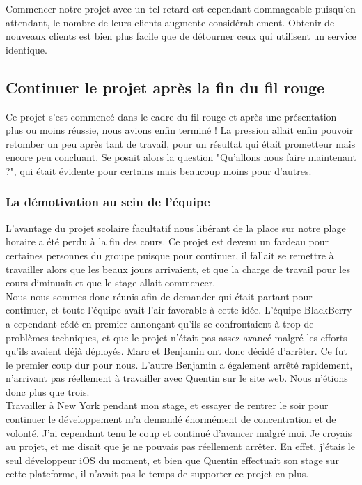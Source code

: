 \documentclass{article}
\begin{document}
		Commencer notre projet avec un tel retard est cependant dommageable puisqu'en attendant, le nombre de leurs clients augmente considérablement. Obtenir de nouveaux clients est bien plus facile que de détourner ceux qui utilisent un service identique.
		
	\subsection{Continuer le projet après la fin du fil rouge}
	Ce projet s'est commencé dans le cadre du fil rouge et après une présentation plus ou moins réussie, nous avions enfin terminé ! La pression allait enfin pouvoir retomber un peu après tant de travail, pour un résultat qui était prometteur mais encore peu concluant. Se posait alors la question "Qu'allons nous faire maintenant ?", qui était évidente pour certains mais beaucoup moins pour d'autres.


		\subsubsection{La démotivation au sein de l'équipe}
		L'avantage du projet scolaire facultatif nous libérant de la place sur notre plage horaire a été perdu à la fin des cours. Ce projet est devenu un fardeau pour certaines personnes du groupe puisque pour continuer, il fallait se remettre à travailler alors que les beaux jours arrivaient, et que la charge de travail pour les cours diminuait et que le stage allait commencer. \\
		
		Nous nous sommes donc réunis afin de demander qui était partant pour continuer, et toute l'équipe avait l'air favorable à cette idée. L'équipe BlackBerry a cependant cédé en premier annonçant qu'ils se confrontaient à trop de problèmes techniques, et que le projet n'était pas assez avancé malgré les efforts qu'ils avaient déjà déployés. Marc et Benjamin ont donc décidé d'arrêter. Ce fut le premier coup dur pour nous. L'autre Benjamin a également arrêté rapidement, n'arrivant pas réellement à travailler avec Quentin sur le site web. Nous n'étions donc plus que trois. \\
		
		Travailler à New York pendant mon stage, et essayer de rentrer le soir pour continuer le développement m'a demandé énormément de concentration et de volonté. J'ai cependant tenu le coup et continué d'avancer malgré moi. Je croyais au projet, et me disait que je ne pouvais pas réellement arrêter. En effet, j'étais le seul développeur iOS du moment, et bien que Quentin effectuait son stage sur cette plateforme, il n'avait pas le temps de supporter ce projet en plus. \\
	
\end{document}
